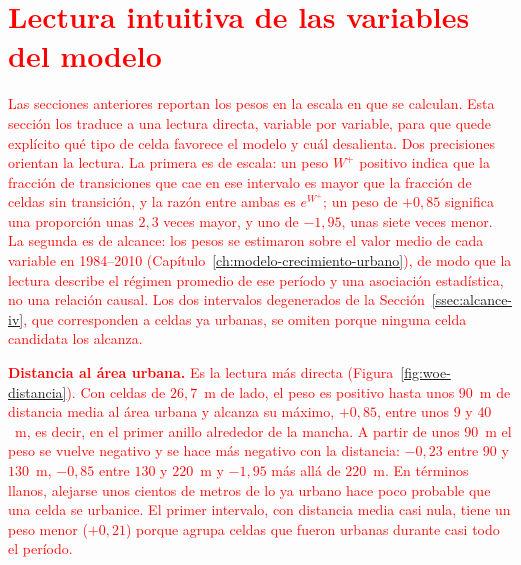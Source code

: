 
\section{\textcolor{red}{Lectura intuitiva de las variables del modelo}}
\label{sec:lectura-intuitiva}

\textcolor{red}{Las secciones anteriores reportan los pesos en la escala en que se
calculan. Esta sección los traduce a una lectura directa, variable por
variable, para que quede explícito qué tipo de celda favorece el modelo y cuál
desalienta. Dos precisiones orientan la lectura. La primera es de escala: un
peso $W^+$ positivo indica que la fracción de transiciones que cae en ese
intervalo es mayor que la fracción de celdas sin transición, y la razón entre
ambas es $e^{W^+}$; un peso de $+0{,}85$ significa una proporción unas $2{,}3$
veces mayor, y uno de $-1{,}95$, unas siete veces menor. La segunda es de
alcance: los pesos se estimaron sobre el valor medio de cada variable en
1984--2010 (Capítulo~\ref{ch:modelo-crecimiento-urbano}), de modo que la
lectura describe el régimen promedio de ese período y una asociación
estadística, no una relación causal. Los dos intervalos degenerados de la
Sección~\ref{ssec:alcance-iv}, que corresponden a celdas ya urbanas, se omiten
porque ninguna celda candidata los alcanza.}

\textcolor{red}{\textbf{Distancia al área urbana.} Es la lectura más directa (Figura~\ref{fig:woe-distancia}). Con
celdas de $26{,}7$~m de lado, el peso es positivo hasta unos $90$~m de
distancia media al área urbana y alcanza su máximo, $+0{,}85$, entre unos $9$ y
$40$~m, es decir, en el primer anillo alrededor de la mancha. A partir de unos
$90$~m el peso se vuelve negativo y se hace más negativo con la distancia:
$-0{,}23$ entre $90$ y $130$~m, $-0{,}85$ entre $130$ y $220$~m y $-1{,}95$ más
allá de $220$~m. En términos llanos, alejarse unos cientos de metros de lo ya
urbano hace poco probable que una celda se urbanice. El primer intervalo, con
distancia media casi nula, tiene un peso menor ($+0{,}21$) porque agrupa celdas
que fueron urbanas durante casi todo el período.}

